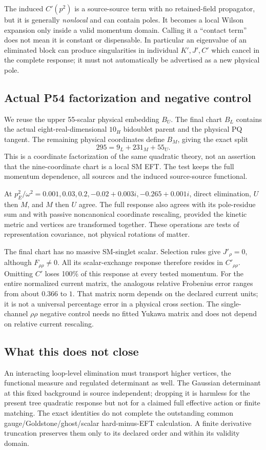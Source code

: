 \documentclass[11pt]{article}
\begin{document}
The induced $C'(p^2)$ is a source-source term with no retained-field
propagator, but it is generally \emph{nonlocal} and can contain poles.
It becomes a local Wilson expansion only inside a valid momentum
domain. Calling it a ``contact term'' does not mean it is constant or
dispensable. In particular an eigenvalue of an eliminated block can
produce singularities in individual $K',J',C'$ which cancel in the
complete response; it must not automatically be advertised as a new
physical pole.

\subsection{Actual P54 factorization and negative control}
We reuse the upper 55-scalar physical embedding $B_U$. The final chart
$B_L$ contains the actual eight-real-dimensional $10_H$ bidoublet parent
and the physical PQ tangent. The remaining physical coordinates define
$B_M$, giving the exact split
\begin{equation}
 295=9_L+231_M+55_U.
\end{equation}
This is a coordinate factorization of the same quadratic theory, not
an assertion that the nine-coordinate chart is a local SM EFT.
The test keeps the full momentum dependence, all sources and the
induced source-source functional.

At $p_E^2/\omega^2=0.001,0.03,0.2,-0.02+0.003i,-0.265+0.001i$,
direct elimination, $U$ then $M$, and $M$ then $U$ agree. The full
response also agrees with its pole-residue sum and with passive
noncanonical coordinate rescaling, provided the kinetic metric and
vertices are transformed together. These operations are tests of
representation covariance, not physical rotations of matter.

The final chart has no massive SM-singlet scalar. Selection rules give
$J'_\rho=0$, although $F_{\rho\rho}\ne0$. All its scalar-exchange response
therefore resides in $C'_{\rho\rho}$. Omitting $C'$ loses 100\% of this
response at every tested momentum. For the entire normalized current
matrix, the analogous relative Frobenius error ranges from about
$0.366$ to $1$. That matrix norm depends on the declared current units;
it is not a universal percentage error in a physical cross section.
The single-channel $\rho\rho$ negative control needs no fitted Yukawa
matrix and does not depend on relative current rescaling.

\subsection{What this does not close}
An interacting loop-level elimination must transport higher vertices,
the functional measure and regulated determinant as well. The Gaussian
determinant at this fixed background is source independent; dropping it
is harmless for the present tree quadratic response but not for a
claimed full effective action or finite matching. The exact identities
do not complete the outstanding common gauge/Goldstone/ghost/scalar
hard-minus-EFT calculation. A finite derivative truncation preserves
them only to its declared order and within its validity domain.
\end{document}
